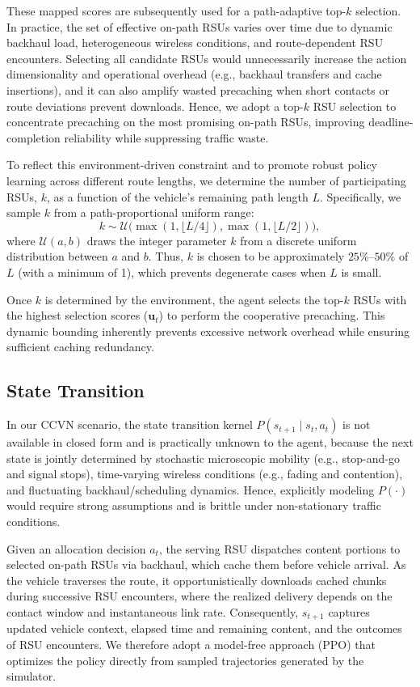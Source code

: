 These mapped scores are subsequently used for a path-adaptive top-$k$ selection. In practice, the set of effective on-path RSUs varies over time due to dynamic backhaul load, heterogeneous wireless conditions, and route-dependent RSU encounters. Selecting all candidate RSUs would unnecessarily increase the action dimensionality and operational overhead (e.g., backhaul transfers and cache insertions), and it can also amplify wasted precaching when short contacts or route deviations prevent downloads. Hence, we adopt a top-$k$ RSU selection to concentrate precaching on the most promising on-path RSUs, improving deadline-completion reliability while suppressing traffic waste.

To reflect this environment-driven constraint and to promote robust policy learning across different route lengths, we determine the number of participating RSUs, $k$, as a function of the vehicle’s remaining path length $L$. Specifically, we sample $k$ from a path-proportional uniform range:
\begin{equation}
k \sim \mathcal{U}\Big(\max(1, \lfloor L/4 \rfloor), \max(1, \lfloor L/2 \rfloor)\Big),
\end{equation}
where $\mathcal{U}(a,b)$ draws the integer parameter $k$ from a discrete uniform distribution between $a$ and $b$.
Thus, $k$ is chosen to be approximately $25\%$--$50\%$ of $L$ (with a minimum of 1), which prevents degenerate cases when $L$ is small.

Once $k$ is determined by the environment, the agent selects the top-$k$ RSUs with the highest selection scores ($\mathbf{u}_t$) to perform the cooperative precaching. This dynamic bounding inherently prevents excessive network overhead while ensuring sufficient caching redundancy.

\subsection{State Transition}
In our CCVN scenario, the state transition kernel $P(s_{t+1}\!\mid s_t,a_t)$ is not available in closed form and is practically unknown to the agent, because the next state is jointly determined by stochastic microscopic mobility (e.g., stop-and-go and signal stops), time-varying wireless conditions (e.g., fading and contention), and fluctuating backhaul/scheduling dynamics. Hence, explicitly modeling $P(\cdot)$ would require strong assumptions and is brittle under non-stationary traffic conditions.

Given an allocation decision $a_t$, the serving RSU dispatches content portions to selected on-path RSUs via backhaul, which cache them before vehicle arrival. As the vehicle traverses the route, it opportunistically downloads cached chunks during successive RSU encounters, where the realized delivery depends on the contact window and instantaneous link rate. Consequently, $s_{t+1}$ captures updated vehicle context, elapsed time and remaining content, and the outcomes of RSU encounters. We therefore adopt a model-free approach (PPO) that optimizes the policy directly from sampled trajectories generated by the simulator.

